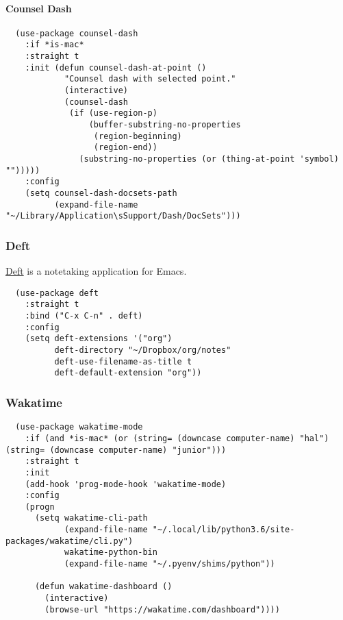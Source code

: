 \documentclass[11pt]{article}
\begin{document}
\paragraph*{Counsel Dash}
\label{sec:org90f0b0b}

\begin{verbatim}
  (use-package counsel-dash
    :if *is-mac*
    :straight t
    :init (defun counsel-dash-at-point ()
            "Counsel dash with selected point."
            (interactive)
            (counsel-dash
             (if (use-region-p)
                 (buffer-substring-no-properties
                  (region-beginning)
                  (region-end))
               (substring-no-properties (or (thing-at-point 'symbol) "")))))
    :config
    (setq counsel-dash-docsets-path
          (expand-file-name "~/Library/Application\sSupport/Dash/DocSets")))
\end{verbatim}

\subsubsection*{Deft}
\label{sec:org5c8a397}

\href{https://jblevins.org/projects/deft/}{Deft} is a notetaking application for Emacs.

\begin{verbatim}
  (use-package deft
    :straight t
    :bind ("C-x C-n" . deft)
    :config
    (setq deft-extensions '("org")
          deft-directory "~/Dropbox/org/notes"
          deft-use-filename-as-title t
          deft-default-extension "org"))
\end{verbatim}

\subsubsection*{Wakatime}
\label{sec:orgdf602a2}

\begin{verbatim}
  (use-package wakatime-mode
    :if (and *is-mac* (or (string= (downcase computer-name) "hal") (string= (downcase computer-name) "junior")))
    :straight t
    :init
    (add-hook 'prog-mode-hook 'wakatime-mode)
    :config
    (progn
      (setq wakatime-cli-path
            (expand-file-name "~/.local/lib/python3.6/site-packages/wakatime/cli.py")
            wakatime-python-bin
            (expand-file-name "~/.pyenv/shims/python"))

      (defun wakatime-dashboard ()
        (interactive)
        (browse-url "https://wakatime.com/dashboard"))))
\end{verbatim}
\end{document}
